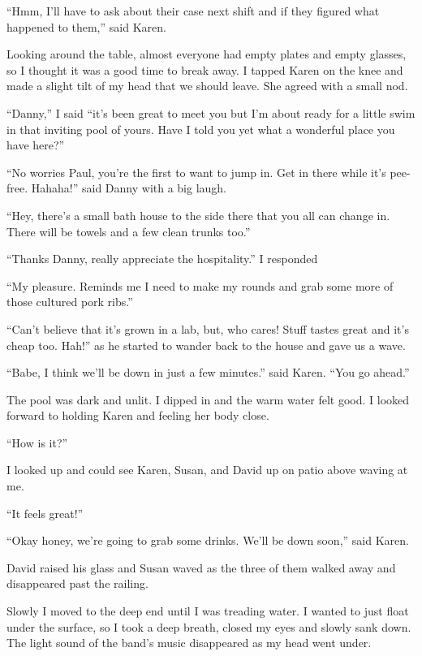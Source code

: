 ``Hmm, I'll have to ask about their case next shift and
if they figured what happened to them,'' said Karen.

Looking around the table, almost everyone had empty
plates and empty glasses, so I thought it was a good time to
break away. I tapped Karen on the knee and made a slight tilt of
my head that we should leave. She agreed with a small nod.

``Danny,'' I said ``it's been great to meet you but I'm about ready
for a little swim in that inviting pool of yours. Have I told
you yet what a wonderful place you have here?''

``No worries Paul, you're the first to want to jump in. Get in
there while it's pee-free. Hahaha!'' said Danny with a big
laugh.

``Hey, there's a small bath house to the side there that you all can
change in. There will be towels and a few clean trunks too.''

``Thanks Danny, really appreciate the hospitality.'' I responded

``My pleasure. Reminds me I need
to make my rounds and grab some more of those cultured pork
ribs.''

``Can't believe that it's grown in a lab, but, who cares!
Stuff tastes great and it's cheap too. Hah!'' as he started
to wander back to the house and gave us a wave.

``Babe, I think we'll be down in just a few minutes.'' said
Karen. ``You go ahead.''


\subsectsep

The pool was dark and unlit.  I dipped in and the warm water
felt good. I looked forward to holding Karen and
feeling her body close.

``How is it?''

I looked up and could see Karen, Susan, and David up on patio above waving at
me.

``It feels great!''

``Okay honey, we're going to grab some drinks. We'll be down
soon,'' said Karen.

David raised his glass and Susan waved as the three of them
walked away and disappeared past the railing.

Slowly I moved to the deep end until I was treading water. I
wanted to just float under the surface, so I took a deep breath,
closed my eyes and slowly sank down. The light sound of the
band's music disappeared as my head went under.

